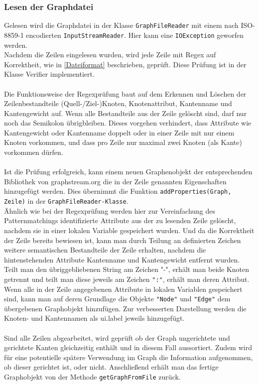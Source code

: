 \documentclass[a4paper]{article}
\begin{document}
\subsubsection{Lesen der Graphdatei}
Gelesen wird die Graphdatei in der Klasse \verb|GraphFileReader| mit einem nach ISO-8859-1 encodierten \verb|InputStreamReader|. Hier kann eine \verb|IOException| geworfen werden.\\
Nachdem die Zeilen eingelesen wurden, wird jede Zeile mit Regex auf Korrektheit, wie in \ref{Dateiformat} beschrieben, geprüft. Diese Prüfung ist in der Klasse Verifier implementiert.\\ \\
Die Funktionsweise der Regexprüfung baut auf dem Erkennen und Löschen der Zeilenbestandteile (Quell-/Ziel-)Knoten, Knotenattribut, Kantenname und Kantengewicht auf. Wenn alle Bestandteile aus der Zeile gelöscht sind, darf nur noch das Semikolon übrigbleiben. Dieses vorgehen verhindert, dass Attribute wie Kantengewicht oder Kantenname doppelt oder in einer
Zeile mit nur einem Knoten vorkommen, und dass pro Zeile nur maximal zwei Knoten (als Kante) vorkommen dürfen.\\ \\
Ist die Prüfung erfolgreich, kann einem neuen Graphenobjekt der entsprechenden Bibliothek von graphstream.org die in der Zeile genannten Eigenschaften hinzugefügt werden. Dies übernimmt die Funktion \verb|addProperties(Graph, Zeile)| in der \verb|GraphFileReader-Klasse|.\\
Ähnlich wie bei der Regexprüfung werden hier zur Vereinfachung des Patternmatchings identifizierte Attribute aus der zu lesenden Zeile gelöscht, nachdem sie in einer lokalen Variable gespeichert wurden. Und da die Korrektheit der Zeile bereits bewiesen ist, kann man durch Teilung an definierten Zeichen weitere semantischen Bestandteile der Zeile erhalten, nachdem die hintenstehenden Attribute Kantenname und Kantengewicht entfernt wurden. Teilt man den übriggebliebenen String am Zeichen "-", erhält man beide Knoten getrennt und teilt man diese jeweils am Zeichen \verb|":"|, erhält man deren Attribut.\\
Wenn alle in der Zeile angegebenen Attribute in lokalen Variablen gespeichert sind, kann man auf deren Grundlage die Objekte \verb|"Node"| und \verb|"Edge"| dem übergebenen Graphobjekt hinzufügen. Zur verbesserten Darstellung werden die Knoten- und Kantennamen als ui.label jeweils hinzugefügt.\\ \\
Sind alle Zeilen abgearbeitet, wird geprüft ob der Graph ungerichtete und gerichtete Kanten gleichzeitig enthält und in diesem Fall aussortiert. Zudem wird für eine potentielle spätere Verwendung im Graph die Information aufgenommen, ob dieser gerichtet ist, oder nicht. Anschließend erhält man das fertige Graphobjekt von der Methode \verb|getGraphFromFile| zurück.\\
\end{document}
